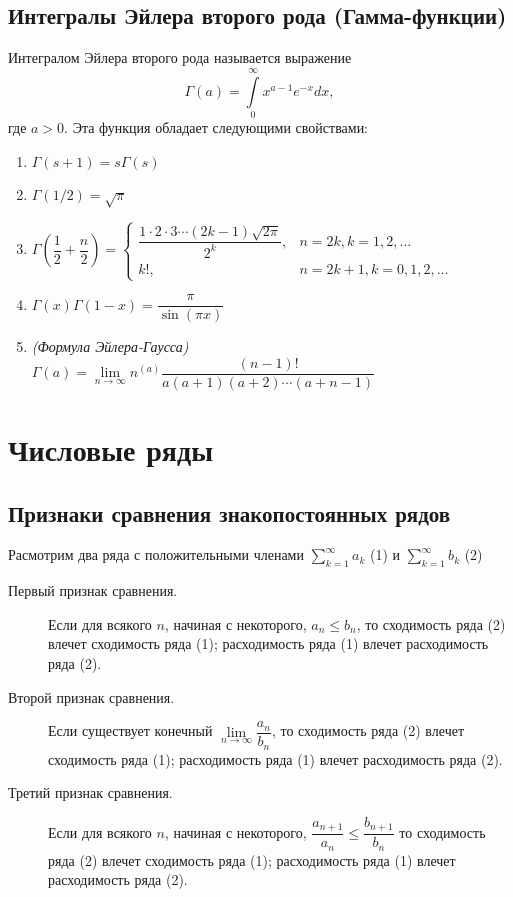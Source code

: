 \documentclass[a4paper,12pt]{scrartcl}
\begin{document}
\subsection{Интегралы Эйлера второго рода (Гамма-функции)}
Интегралом Эйлера второго рода называется выражение
$$\Gamma(a) = \int\limits_{0}^{\infty}x^{a-1}e^{-x}dx,$$ где $a>0$. Эта функция обладает следующими свойствами:
\begin{enumerate}
\item $\Gamma(s+1) = s\Gamma(s)$
\item $\Gamma(1/2) = \sqrt{\pi}$
\item $\Gamma\left(\dfrac{1}{2} + \dfrac{n}{2}\right) = \begin{cases} \dfrac{1\cdot2\cdot3\cdots(2k-1)\sqrt{2\pi}}{2^k}, & n = 2k, k = 1,2,\ldots \\ k!, & n = 2k+1, k = 0,1,2,\ldots \end{cases}$
\item $\Gamma(x)\Gamma(1-x) = \dfrac{\pi}{\sin(\pi x)}$
\item \emph{(Формула Эйлера-Гаусса)}$\Gamma(a) = \lim\limits_{n\to\infty}n^{(a)}\dfrac{(n-1)!}{a(a+1)(a+2)\cdots(a+n-1)} $ 
\end{enumerate}
\section{Числовые ряды}
\subsection{Признаки сравнения знакопостоянных рядов}
Расмотрим два ряда с положительными членами $\sum\limits_{k=1}^{\infty}a_k$ (1) и $\sum\limits_{k=1}^{\infty}b_k$ (2)
\begin{description}
\item[Первый признак сравнения.] Если для всякого $n$, начиная с некоторого, $a_n \leqslant b_n $, то сходимость ряда (2) влечет сходимость ряда (1); расходимость ряда (1) влечет расходимость ряда (2).
\item[Второй признак сравнения.] Если существует конечный $\lim\limits_{n\to\infty}\dfrac{a_n}{b_n} $, то сходимость ряда (2) влечет сходимость ряда (1); расходимость ряда (1) влечет расходимость ряда (2).
\item[Третий признак сравнения.] Если для всякого $n$, начиная с некоторого, $ \dfrac{a_{n+1}}{a_n} \leqslant \dfrac{b_{n+1}}{b_n}$ то сходимость ряда (2) влечет сходимость ряда (1); расходимость ряда (1) влечет расходимость ряда (2).
\end{description}
\end{document}
